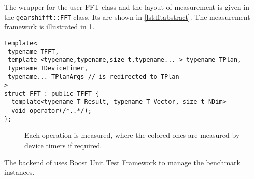 The wrapper for the user FFT class and the layout of measurement is given in the \lstinline!gearshifft::FFT! class.
Its are shown in \cref{lst:fftabstract}. The measurement framework is illustrated in \cref{fig:timings}.
\begin{lstlisting}[caption={FFT wrapper class},label={lst:fftabstract}]
template<
 typename TFFT,
 template <typename,typename,size_t,typename... > typename TPlan,
 typename TDeviceTimer,
 typename... TPlanArgs // is redirected to TPlan
>
struct FFT : public TFFT {
  template<typename T_Result, typename T_Vector, size_t NDim>
  void operator(/*..*/);
};
\end{lstlisting}

\begin{figure}\label{fig:timings}
 \caption{Each operation is measured, where the colored ones are measured by device timers if required.}
\end{figure}


The backend of \gearshifft{} uses Boost Unit Test Framework to manage the benchmark instances.

